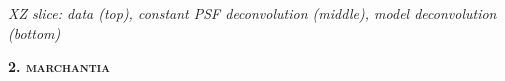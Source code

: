 \documentclass[a0paper,portrait,fontscale=0.35]{baposter}
\newcommand{\mycaption}[1]{
  {
    \smaller
    \emph{#1}
  }
}
\theoremstyle{plain}
\theoremstyle{plain}
\theoremstyle{definition}
\theoremstyle{plain}
\theoremstyle{definition}
\begin{document}
\begin{poster}
{\begin{minipage}[t]{0.33\textwidth}
\begin{minipage}[t]{0.85\textwidth}
      \vspace{-0.5em}
      \centering

      \vspace{-1em}
      \begin{center}
        \mycaption{
          XZ slice:
          data (top), constant PSF deconvolution (middle),
          model deconvolution (bottom)
        }
      \end{center}
    \end{minipage}
  \end{minipage}
  \begin{minipage}[t]{0.33\textwidth}
    \begin{center}
      \larger
      \textbf{\textsc{2. marchantia}}
    \end{center}


\end{minipage}}
\end{poster}
\end{document}
